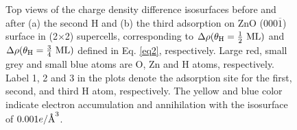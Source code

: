 \begingroup
\begin{figure}[!ht]
  \centering
  \label{Chap:ZnO_H:fig:chgdiff1}
  \label{Chap:ZnO_H:fig:chgdiff2}
\caption[Top views of the charge density difference isosurfaces before and after H adsorption]{Top views of the charge density difference isosurfaces before and after (a) the second H and (b) the third adsorption on ZnO (000$\overline{1}$) surface in (2$\times$2) supercells, corresponding to $\Delta\rho(\theta_{\textup{H}}= \frac{1}{2} \textup{ ML})$ and $\Delta\rho(\theta_{\textup{H}}= \frac{3}{4} \textup{ ML})$ defined in Eq. \ref{eq2}, respectively. Large red, small grey and small blue atoms are O, Zn and H atoms, respectively. Label 1, 2 and 3 in the plots denote the adsorption site for the first, second, and third H atom, respectively. The yellow and blue color indicate electron accumulation and annihilation with the isosurface of $0.001e/{\textup{\AA}}^3$.}
  \label{fig3}
\end{figure}
\endgroup

